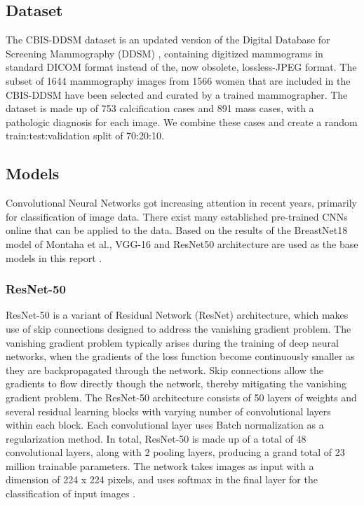 \documentclass[sn-mathphys,Numbered]{sn-jnl}%
\theoremstyle{thmstyleone}%
\theoremstyle{thmstyletwo}%
\theoremstyle{thmstylethree}%
\begin{document}
\subsection{Dataset}\label{Dataset}
The CBIS-DDSM dataset \cite{Lee2017-hi} is an updated version of the Digital Database for Screening Mammography (DDSM) \cite{Heath2007THEDD}, containing digitized mammograms  in standard DICOM format instead of the, now obsolete, lossless-JPEG format. The subset of 1644 mammography images from 1566 women that are included in the CBIS-DDSM have been selected and curated by a trained mammographer. The dataset is made up of 753 calcification cases and 891 mass cases, with a pathologic diagnosis for each image. We combine these cases and create a random train:test:validation split of 70:20:10.

\subsection{Models}\label{Models}
Convolutional Neural Networks got increasing attention in recent years, primarily for classification of image data. There exist many established pre-trained CNNs online that can be applied to the data. Based on the results of the BreastNet18 model of Montaha et al., VGG-16 and ResNet50 architecture are used as the base models in this report \cite{Montaha_2021}.
\subsubsection{ResNet-50}\label{ResNet}
ResNet-50 is a variant of Residual Network (ResNet) architecture, which makes use of skip connections designed to address the vanishing gradient problem. The vanishing gradient problem typically arises during the training of deep neural networks, when the gradients of the loss function become continuously smaller as they are backpropagated through the network. Skip connections allow the gradients  to flow directly though the network, thereby mitigating the vanishing gradient problem. The ResNet-50 architecture consists of 50 layers of weights and several residual learning blocks with varying number of convolutional layers within each block. Each convolutional layer uses Batch normalization as a regularization method. In total, ResNet-50 is made up of a total of  48 convolutional layers, along with 2 pooling layers, producing a grand total of 23 million trainable parameters. The network takes images as input with a dimension of 224 x 224 pixels, and uses softmax in the final layer for the classification of input images \cite{he2015deep}.
\end{document}
